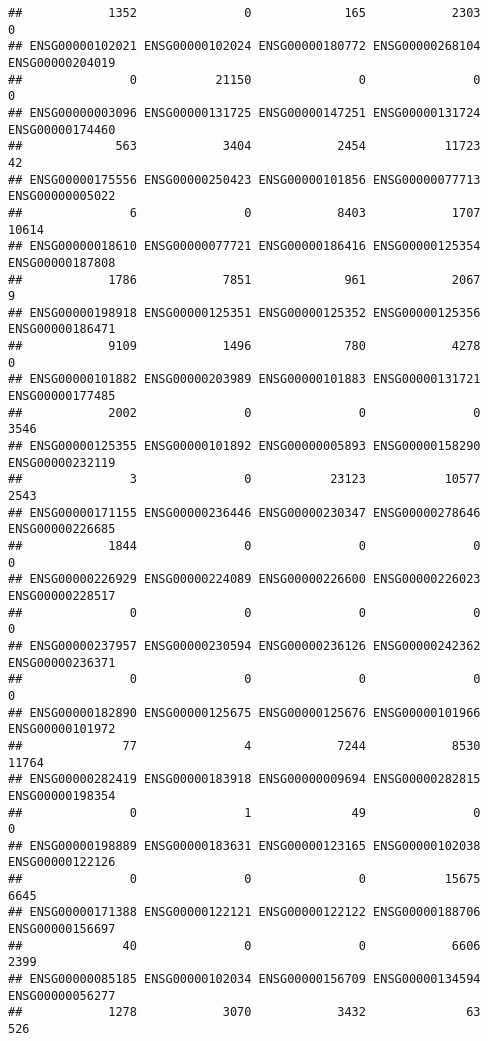 \documentclass[
]{article}
\begin{document}
\begin{verbatim}
##            1352               0             165            2303               0 
## ENSG00000102021 ENSG00000102024 ENSG00000180772 ENSG00000268104 ENSG00000204019 
##               0           21150               0               0               0 
## ENSG00000003096 ENSG00000131725 ENSG00000147251 ENSG00000131724 ENSG00000174460 
##             563            3404            2454           11723              42 
## ENSG00000175556 ENSG00000250423 ENSG00000101856 ENSG00000077713 ENSG00000005022 
##               6               0            8403            1707           10614 
## ENSG00000018610 ENSG00000077721 ENSG00000186416 ENSG00000125354 ENSG00000187808 
##            1786            7851             961            2067               9 
## ENSG00000198918 ENSG00000125351 ENSG00000125352 ENSG00000125356 ENSG00000186471 
##            9109            1496             780            4278               0 
## ENSG00000101882 ENSG00000203989 ENSG00000101883 ENSG00000131721 ENSG00000177485 
##            2002               0               0               0            3546 
## ENSG00000125355 ENSG00000101892 ENSG00000005893 ENSG00000158290 ENSG00000232119 
##               3               0           23123           10577            2543 
## ENSG00000171155 ENSG00000236446 ENSG00000230347 ENSG00000278646 ENSG00000226685 
##            1844               0               0               0               0 
## ENSG00000226929 ENSG00000224089 ENSG00000226600 ENSG00000226023 ENSG00000228517 
##               0               0               0               0               0 
## ENSG00000237957 ENSG00000230594 ENSG00000236126 ENSG00000242362 ENSG00000236371 
##               0               0               0               0               0 
## ENSG00000182890 ENSG00000125675 ENSG00000125676 ENSG00000101966 ENSG00000101972 
##              77               4            7244            8530           11764 
## ENSG00000282419 ENSG00000183918 ENSG00000009694 ENSG00000282815 ENSG00000198354 
##               0               1              49               0               0 
## ENSG00000198889 ENSG00000183631 ENSG00000123165 ENSG00000102038 ENSG00000122126 
##               0               0               0           15675            6645 
## ENSG00000171388 ENSG00000122121 ENSG00000122122 ENSG00000188706 ENSG00000156697 
##              40               0               0            6606            2399 
## ENSG00000085185 ENSG00000102034 ENSG00000156709 ENSG00000134594 ENSG00000056277 
##            1278            3070            3432              63             526 

\end{verbatim}
\end{document}

